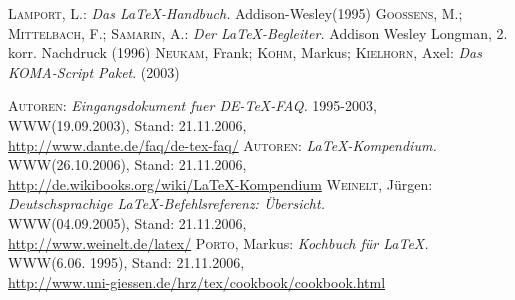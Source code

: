 

\begin{thebibliography}{999}
\textsc{Lamport}, L.: \textit{Das \LaTeX-Handbuch.} Addison-Wesley(1995)  
	 \textsc{Goossens}, M.; \textsc{Mittelbach}, F.; \textsc{Samarin}, A.: \textit{Der \LaTeX-Begleiter.} Addison Wesley Longman, 2.\,korr. Nachdruck (1996)
 \textsc{Neukam}, Frank; \textsc{Kohm}, Markus; \textsc{Kielhorn}, Axel: \textit{Das KOMA-Script Paket}. (2003)	
			 		
 \textsc{Autoren}: \textit{Eingangsdokument fuer DE-TeX-FAQ.} 1995-2003,\\ 
			{\small WWW(19.09.2003), Stand: 21.11.2006,}\\ 
			\url{http://www.dante.de/faq/de-tex-faq/}
 \textsc{Autoren}: \textit{\LaTeX-Kompendium.}\\
			{\small WWW(26.10.2006), Stand: 21.11.2006,}\\
			\url{http://de.wikibooks.org/wiki/LaTeX-Kompendium}
 \textsc{Weinelt}, Jürgen: \textit{Deutschsprachige LaTeX-Befehlsreferenz: Übersicht.}\\
			{\small WWW(04.09.2005), Stand: 21.11.2006,} \\
			\url{http://www.weinelt.de/latex/}
 \textsc{Porto}, Markus: \textit{Kochbuch für \LaTeX.}\\ 
			{\small WWW(6.06. 1995), Stand: 21.11.2006,}\\ 			
			\url{http://www.uni-giessen.de/hrz/tex/cookbook/cookbook.html}
	
\end{thebibliography}
